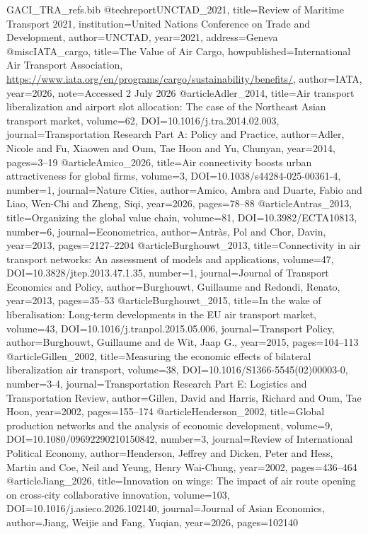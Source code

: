 \begin{filecontents*}[overwrite]{GACI_TRA_refs.bib}
@techreport{UNCTAD_2021, title={Review of Maritime Transport 2021}, institution={United Nations Conference on Trade and Development}, author={{UNCTAD}}, year={2021}, address={Geneva} }
@misc{IATA_cargo, title={The Value of Air Cargo}, howpublished={International Air Transport Association, \url{https://www.iata.org/en/programs/cargo/sustainability/benefits/}}, author={{IATA}}, year={2026}, note={Accessed 2 July 2026} }
@article{Adler_2014, title={Air transport liberalization and airport slot allocation: The case of the Northeast Asian transport market}, volume={62}, DOI={10.1016/j.tra.2014.02.003}, journal={Transportation Research Part A: Policy and Practice}, author={Adler, Nicole and Fu, Xiaowen and Oum, Tae Hoon and Yu, Chunyan}, year={2014}, pages={3--19} }
@article{Amico_2026, title={Air connectivity boosts urban attractiveness for global firms}, volume={3}, DOI={10.1038/s44284-025-00361-4}, number={1}, journal={Nature Cities}, author={Amico, Ambra and Duarte, Fabio and Liao, Wen-Chi and Zheng, Siqi}, year={2026}, pages={78--88} }
@article{Antras_2013, title={Organizing the global value chain}, volume={81}, DOI={10.3982/ECTA10813}, number={6}, journal={Econometrica}, author={Antr\`as, Pol and Chor, Davin}, year={2013}, pages={2127--2204} }
@article{Burghouwt_2013, title={Connectivity in air transport networks: An assessment of models and applications}, volume={47}, DOI={10.3828/jtep.2013.47.1.35}, number={1}, journal={Journal of Transport Economics and Policy}, author={Burghouwt, Guillaume and Redondi, Renato}, year={2013}, pages={35--53} }
@article{Burghouwt_2015, title={In the wake of liberalisation: Long-term developments in the EU air transport market}, volume={43}, DOI={10.1016/j.tranpol.2015.05.006}, journal={Transport Policy}, author={Burghouwt, Guillaume and de Wit, Jaap G.}, year={2015}, pages={104--113} }
@article{Gillen_2002, title={Measuring the economic effects of bilateral liberalization air transport}, volume={38}, DOI={10.1016/S1366-5545(02)00003-0}, number={3-4}, journal={Transportation Research Part E: Logistics and Transportation Review}, author={Gillen, David and Harris, Richard and Oum, Tae Hoon}, year={2002}, pages={155--174} }
@article{Henderson_2002, title={Global production networks and the analysis of economic development}, volume={9}, DOI={10.1080/09692290210150842}, number={3}, journal={Review of International Political Economy}, author={Henderson, Jeffrey and Dicken, Peter and Hess, Martin and Coe, Neil and Yeung, Henry Wai-Chung}, year={2002}, pages={436--464} }
@article{Jiang_2026, title={Innovation on wings: The impact of air route opening on cross-city collaborative innovation}, volume={103}, DOI={10.1016/j.asieco.2026.102140}, journal={Journal of Asian Economics}, author={Jiang, Weijie and Fang, Yuqian}, year={2026}, pages={102140} }

\end{filecontents*}
